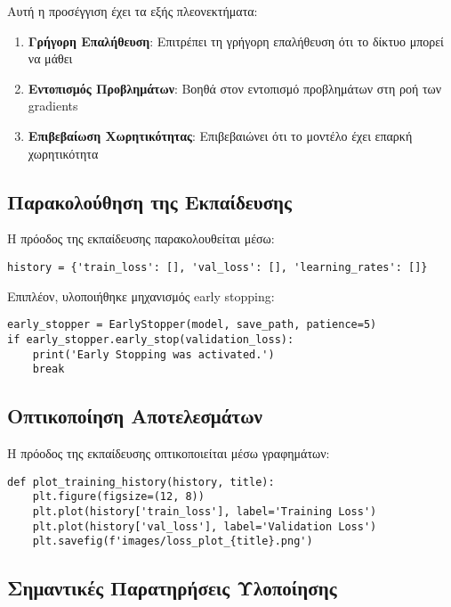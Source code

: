 \documentclass[a4paper,12pt]{article}
\begin{document}
Αυτή η προσέγγιση έχει τα εξής πλεονεκτήματα:

\begin{enumerate}
    \item \textbf{Γρήγορη Επαλήθευση}: Επιτρέπει τη γρήγορη επαλήθευση ότι το δίκτυο μπορεί να μάθει
    \item \textbf{Εντοπισμός Προβλημάτων}: Βοηθά στον εντοπισμό προβλημάτων στη ροή των gradients
    \item \textbf{Επιβεβαίωση Χωρητικότητας}: Επιβεβαιώνει ότι το μοντέλο έχει επαρκή χωρητικότητα
\end{enumerate}

\subsection*{Παρακολούθηση της Εκπαίδευσης}

Η πρόοδος της εκπαίδευσης παρακολουθείται μέσω:

\begin{verbatim}
history = {'train_loss': [], 'val_loss': [], 'learning_rates': []}
\end{verbatim}

Επιπλέον, υλοποιήθηκε μηχανισμός early stopping:

\begin{verbatim}
early_stopper = EarlyStopper(model, save_path, patience=5)
if early_stopper.early_stop(validation_loss):
    print('Early Stopping was activated.')
    break
\end{verbatim}

\subsection*{Οπτικοποίηση Αποτελεσμάτων}

Η πρόοδος της εκπαίδευσης οπτικοποιείται μέσω γραφημάτων:

\begin{verbatim}
def plot_training_history(history, title):
    plt.figure(figsize=(12, 8))
    plt.plot(history['train_loss'], label='Training Loss')
    plt.plot(history['val_loss'], label='Validation Loss')
    plt.savefig(f'images/loss_plot_{title}.png')
\end{verbatim}

\subsection*{Σημαντικές Παρατηρήσεις Υλοποίησης}
\end{document}

